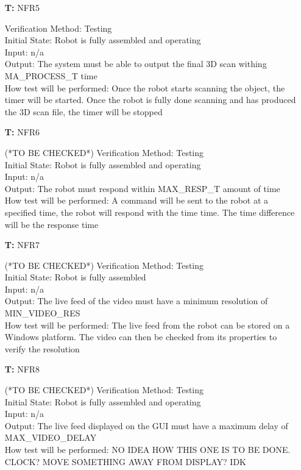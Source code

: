 \documentclass[12pt, titlepage]{article}
\newcounter{tnum} %
\begin{document}
\begin{itemize}
\item[\textbf{T\refstepcounter{tnum}\thetnum:}]{NFR5\\}

Verification Method: Testing	\\				
Initial State: Robot is fully assembled and operating	\\			
Input: n/a\\
Output: The system must be able to output the final 3D scan withing MA\_PROCESS\_T time \\
How test will be performed: Once the robot starts scanning the object, the timer will be started. Once the robot is fully done scanning and has produced the 3D scan file, the timer will be stopped \\

\item[\textbf{T\refstepcounter{tnum}\thetnum:}]{NFR6\\}

(*TO BE CHECKED*)
Verification Method: Testing	\\				
Initial State: Robot is fully assembled	and operating\\			
Input: n/a\\
Output: The robot must respond within MAX\_RESP\_T amount of time \\
How test will be performed: A command will be sent to the robot at a specified time, the robot will respond with the time time. The time difference will be the response time \\

\item[\textbf{T\refstepcounter{tnum}\thetnum:}]{NFR7\\}

(*TO BE CHECKED*)
Verification Method: Testing	\\				
Initial State: Robot is fully assembled	\\			
Input: n/a\\
Output: The live feed of the video must have a minimum resolution of  MIN\_VIDEO\_RES \\
How test will be performed: The live feed from the robot can be stored on a Windows platform. The video can then be checked from its properties to verify the resolution \\

\item[\textbf{T\refstepcounter{tnum}\thetnum:}]{NFR8\\}

(*TO BE CHECKED*)
Verification Method: Testing	\\				
Initial State: Robot is fully assembled	and operating\\			
Input: n/a\\
Output: The live feed displayed on the GUI must have a maximum delay of MAX\_VIDEO\_DELAY \\
How test will be performed: NO IDEA HOW THIS ONE IS TO BE DONE. CLOCK? MOVE SOMETHING AWAY FROM DISPLAY? IDK

\end{itemize}
\end{document}
